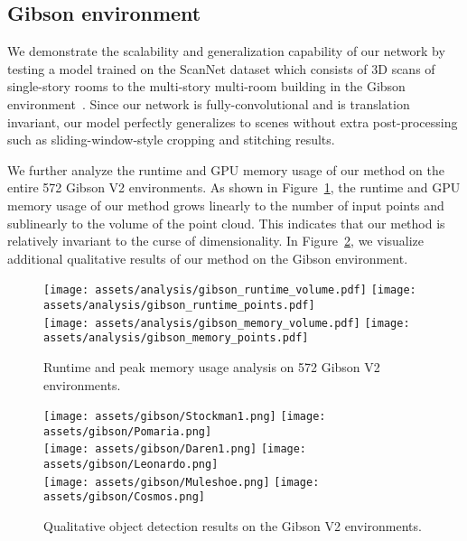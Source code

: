 \documentclass[runningheads]{llncs}
\begin{document}
\subsection{Gibson environment}

We demonstrate the scalability and generalization capability of our network by testing a model trained on the ScanNet dataset which consists of 3D scans of single-story rooms to the multi-story multi-room building in the Gibson environment~\cite{xiazamirhe2018gibsonenv}. Since our network is fully-convolutional and is translation invariant, our model perfectly generalizes to scenes without extra post-processing such as sliding-window-style cropping and stitching results.

We further analyze the runtime and GPU memory usage of our method on the entire 572 Gibson V2 environments. As shown in Figure~\ref{fig:gibson_analysis}, the runtime and GPU memory usage of our method grows linearly to the number of input points and sublinearly to the volume of the point cloud. This indicates that our method is relatively invariant to the curse of dimensionality. In Figure~\ref{fig:gibson_viz}, we visualize additional qualitative results of our method on the Gibson environment.

\begin{figure}
    \centering
    \texttt{[image: assets/analysis/gibson\_runtime\_volume.pdf]} \texttt{[image: assets/analysis/gibson\_runtime\_points.pdf]} \\
    \texttt{[image: assets/analysis/gibson\_memory\_volume.pdf]}
    \texttt{[image: assets/analysis/gibson\_memory\_points.pdf]}
    \caption{Runtime and peak memory usage analysis on 572 Gibson V2 environments.}
    \label{fig:gibson_analysis}
\end{figure}

\begin{figure}
    \centering
    \texttt{[image: assets/gibson/Stockman1.png]} \texttt{[image: assets/gibson/Pomaria.png]} \\
    \texttt{[image: assets/gibson/Daren1.png]}
    \texttt{[image: assets/gibson/Leonardo.png]} \\
    \texttt{[image: assets/gibson/Muleshoe.png]}
    \texttt{[image: assets/gibson/Cosmos.png]}
    \caption{Qualitative object detection results on the Gibson V2 environments.}
    \label{fig:gibson_viz}
\end{figure}


\clearpage
\end{document}
